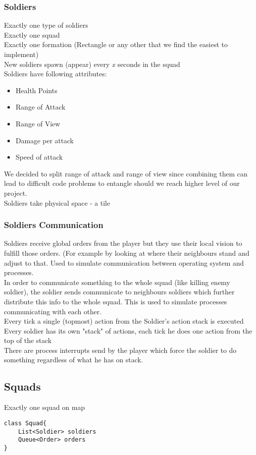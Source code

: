 \documentclass{article}
\begin{document}
\subsubsection{Soldiers}
Exactly one type of soldiers \\ 
Exactly one squad \\
Exactly one formation (Rectangle or any other that we find the easiest to implement) \\
New soldiers spawn (appear) every \textit{x} seconds in the squad \\
Soldiers have following attributes: 
\begin{itemize}
\item Health Points
\item Range of Attack 
\item Range of View
\item Damage per attack 
\item Speed of attack
\end{itemize}
We decided to split range of attack and range of view since combining them can lead to difficult code problems to entangle should we reach higher level of our project. \\
Soldiers take physical space - a tile \\ 

\subsubsection{Soldiers Communication}
Soldiers receive global orders from the player but they use their local vision to fulfill those orders. (For example by looking at where their neighbours stand and adjust to that. Used to simulate communication between operating system and processes. \\ 
In order to communicate something to the whole squad (like killing enemy soldier), the soldier sends communicate to neighbours soldiers which further distribute this info to the whole squad. This is used to simulate processes communicating with each other. \\ 
Every tick a single (topmost) action from the Soldier's action stack is executed
\\
Every soldier has its own "stack" of actions, each tick he does one action from the top of the stack \\
There are process interrupts send by the player which force the soldier to do something regardless of what he has on stack. 

\subsection{Squads}
Exactly one squad on map \\
\begin{lstlisting}[caption={Pseudo-code for Squad class}]
class Squad{
    List<Soldier> soldiers
    Queue<Order> orders 
}
\end{lstlisting}
\end{document}
